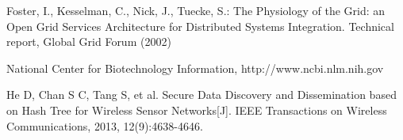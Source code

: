 \documentclass[10pt, conference, compsocconf]{IEEEtran}
\begin{document}
\begin{thebibliography}{12}
 Foster, I., Kesselman, C., Nick, J., Tuecke, S.: The Physiology of the
Grid: an Open Grid Services Architecture for Distributed Systems
Integration. Technical report, Global Grid Forum (2002)

 National Center for Biotechnology Information, http://www.ncbi.nlm.nih.gov

He D, Chan S C, Tang S, et al. Secure Data Discovery and Dissemination based on Hash Tree for Wireless Sensor Networks[J]. IEEE Transactions on Wireless Communications, 2013, 12(9):4638-4646.
\end{thebibliography}
\end{document}
